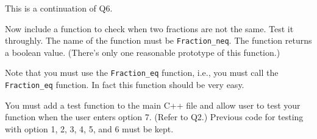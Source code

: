 This is a continuation of Q6.

Now include a function to check when two fractions are not the same.
Test it throughly.
The name of the function must be \verb!Fraction_neq!.
The function returns a boolean value.
(There's only one reasonable prototype of this function.)

Note that you must use the \verb!Fraction_eq! function, i.e.,
you must call the \verb!Fraction_eq! function.
In fact this function should be very easy.

You must add a test function to the main C++ file and allow user to test
your function when the user enters option 7. (Refer to Q2.)
Previous code for testing with option 1, 2, 3, 4, 5, and 6 must be kept.
